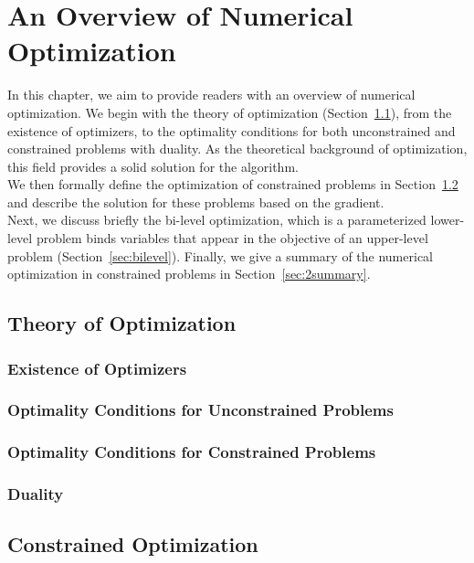 \chapter{An Overview of Numerical Optimization}
\label{cha:overviewpart1}
In this chapter, we aim to provide readers with an overview of numerical optimization. We begin with the theory of optimization (Section~\ref{sec:theory}), from the existence of optimizers, to the optimality conditions for both unconstrained and constrained problems with duality. As the theoretical background of optimization, this field provides a solid solution for the algorithm. \\
We then formally define the optimization of constrained problems in Section~\ref{sec:consopt} and describe the solution for these problems based on the gradient. \\
Next, we discuss briefly the bi-level optimization, which is a parameterized lower-level problem binds variables that appear in the objective of an upper-level problem (Section~\ref{sec:bilevel}). Finally, we give a summary of the numerical optimization in constrained problems in Section~\ref{sec:2summary}.




\section{Theory of Optimization}
\label{sec:theory}
\subsection{Existence of Optimizers}


\subsection{Optimality Conditions for Unconstrained Problems}

\subsection{Optimality Conditions for Constrained Problems}

\subsection{Duality}


\section{Constrained Optimization}
\label{sec:consopt}
